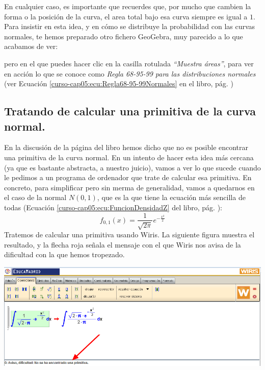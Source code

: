 \documentclass[10pt,a4paper]{article}\usepackage[]{graphicx}\usepackage[]{color}
\newcounter{cont01}
\begin{document}
En cualquier caso, es importante que recuerdes que, por mucho que cambien la forma o la posición de la curva, el area total bajo esa curva siempre es igual a $1$. Para insistir en esta idea, y en cómo se distribuye la probabilidad con las curvas normales, te hemos preparado otro fichero GeoGebra, muy parecido a lo que acabamos de ver:
\begin{center}
\end{center}
pero en el que puedes hacer clic en la casilla rotulada {\em ``Muestra áreas''}, para ver en acción lo que se conoce como {\em Regla 68-95-99 para las distribuciones normales} (ver Ecuación \ref{curso-cap05:ecu:Regla68-95-99Normales} en el libro, pág. \pageref{curso-cap05:ecu:Regla68-95-99Normales})

\subsection{Tratando de calcular una primitiva de la curva normal.}

En la discusión de la página \pageref{curso-cap05:ecu:IntegralNormalIntervalo} del libro hemos dicho que no es posible encontrar una primitiva de la curva normal. En un intento de hacer esta idea más cercana (ya que es bastante abstracta, a nuestro juicio), vamos a ver lo que sucede cuando le pedimos a un programa de ordenador que trate de calcular esa primitiva. En concreto, para simplificar pero sin merma de generalidad, vamos a quedarnos en el caso de la normal $N(0, 1)$, que es la que tiene la ecuación más sencilla de todas (Ecuación \ref{curso-cap05:ecu:FuncionDensidadZ} del libro, pág. \pageref{curso-cap05:ecu:FuncionDensidadZ}):
\[
f_{0,1}(x)=\displaystyle\dfrac{1}{\sqrt{2\pi}}e^{-\frac{x^2}{2}}
\]
Tratemos de calcular una primitiva usando Wiris. La siguiente figura muestra el resultado, y la flecha roja señala el mensaje con el que Wiris nos avisa de la dificultad con la que hemos tropezado.
\begin{center}
\includegraphics[width=15cm]{../fig/Tut05-65.png}
\end{center}
\end{document}
